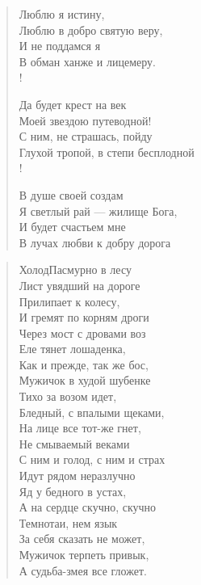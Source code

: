 \begin{verse}
\begin{altverse}
    Люблю я истину,\\
Люблю в добро святую веру,\\
    И не поддамся я\\
В обман ханже и лицемеру.\\!

    Да будет крест на век\\
Моей звездою путеводной!\\
    С ним, не страшась, пойду\\
Глухой тропой, в степи бесплодной\ldotst\\!

    В душе своей создам\\
Я светлый рай --- жилище Бога,\\
    И будет счастьем мне\\
В лучах любви к добру дорога\ldotst
\end{altverse}
\end{verse}

\newpage
\vspace*{0cm}

\begin{verse}
\begin{patverse}
Холод\ldotst Пасмурно в лесу\ldotst\\
   Лист увядший на дороге\\
	  Прилипает к колесу,\\
И гремят по корням дроги\ldotst\\
      Через мост с дровами воз\\
Еле тянет лошаденка,\\
      Как и прежде, так же бос,\\
Мужичок в худой шубенке\\
      Тихо за возом идет,\\
Бледный, с впалыми щеками,\\
      На лице все тот-же гнет,\\
Не смываемый веками\ldotst\\
      С ним и голод, с ним и страх\\
Идут рядом неразлучно\ldotst\\
      Яд у бедного в устах,\\
А на сердце скучно, скучно\ldotst\\
      Темнота\ldotst и, нем язык\\
За себя сказать не может,\\
      Мужичок терпеть привык,\\
А судьба-змея все гложет.
\end{patverse}
\end{verse}

